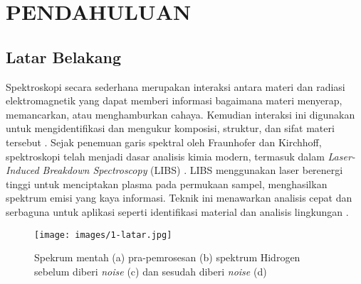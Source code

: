 \chapter{PENDAHULUAN}




\section{Latar Belakang}


\par  Spektroskopi secara sederhana merupakan  interaksi antara materi dan radiasi elektromagnetik yang dapat memberi informasi bagaimana materi menyerap, memancarkan, atau menghamburkan cahaya. Kemudian interaksi ini  digunakan untuk mengidentifikasi dan mengukur komposisi, struktur, dan sifat materi tersebut \parencite{hollas2013}.  
Sejak penemuan garis spektral oleh Fraunhofer dan Kirchhoff, spektroskopi telah menjadi dasar analisis kimia modern, termasuk dalam \textit{Laser-Induced Breakdown Spectroscopy} (LIBS) \parencite{thorne1999}. LIBS menggunakan laser berenergi tinggi untuk menciptakan plasma pada permukaan sampel, menghasilkan spektrum emisi yang kaya informasi. Teknik ini menawarkan analisis cepat dan serbaguna untuk aplikasi seperti identifikasi material dan analisis lingkungan \parencite{thorne1999}.
\begin{figure}
    \centering
    \texttt{[image: images/1-latar.jpg]}
    \caption{Spekrum mentah (a) pra-pemrosesan (b) spektrum Hidrogen sebelum diberi \textit{noise} (c) dan sesudah diberi \textit{noise} (d) \citep{Gasior2023}}
    \label{fig:kenapa}
\end{figure}

